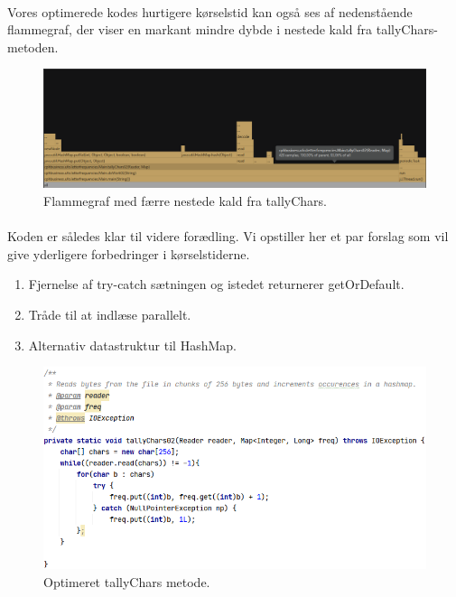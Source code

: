 \documentclass{article}
\begin{document}
\paragraph{}
Vores optimerede kodes hurtigere kørselstid kan også ses af nedenstående flammegraf, der viser en markant mindre dybde i nestede kald fra tallyChars-metoden.
\begin{figure}[htb]
    \centering
    \includegraphics[width=\textwidth]{images/tallyChars02.PNG}
    \caption{Flammegraf med færre nestede kald fra tallyChars.}
    \label{fig:optimeret_fg}
\end{figure}
\paragraph{}
Koden er således klar til videre forædling. Vi opstiller her et par forslag som vil give yderligere forbedringer i kørselstiderne.
\begin{enumerate}
    \item Fjernelse af try-catch sætningen og istedet returnerer getOrDefault.
    \item Tråde til at indlæse parallelt.
    \item Alternativ datastruktur til HashMap.
\end{enumerate}
\begin{figure}[htb]
    \centering
    \includegraphics[width=\textwidth]{images/tallyChars02_code.PNG}
    \caption{Optimeret tallyChars metode.}
    \label{fig:optimeret}
\end{figure}
\end{document}
